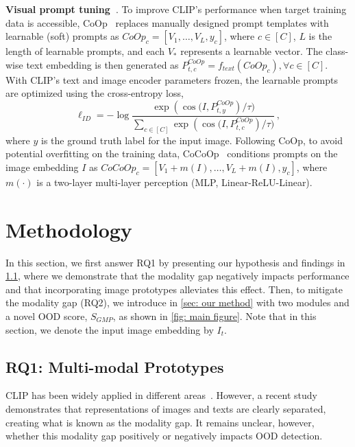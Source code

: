 \noindent
\textbf{Visual prompt tuning~\cite{zhou_learning_2022,zhou2022cocoop,guo_pfedprompt_2023,yao_visual-language_2023}}. 
To improve CLIP's performance when target training data is accessible, CoOp~\cite{zhou_learning_2022} replaces manually designed prompt templates with learnable (soft) prompts as $\textit{CoOp}_c=[V_1, \ldots, V_L, y_c]$, where $c \in [C]$, $L$ is the length of learnable prompts, and each $V_*$ represents a learnable vector. 
The class-wise text embedding is then generated as $P^{\textit{CoOp}}_{t, c}=f_{\textit{text}}(\textit{CoOp}_c), \forall c \in [C]$. 
With CLIP's text and image encoder parameters frozen, the learnable prompts are optimized using the cross-entropy loss,
\begin{equation}
    \ell_{\textit{ID}} = -\log \frac{\exp({\operatorname{cos}(I, P_{t, y}^{\textit{CoOp}} })/ \tau)}{\sum_{c \in [C]} \exp({\operatorname{cos}(I, P_{t, c}^{\textit{CoOp}}})/\tau)}\,,
\end{equation}
where $y$ is the ground truth label for the input image. 
Following CoOp, to avoid potential overfitting on the training data, CoCoOp~\cite{zhou2022cocoop} 
conditions prompts on the image embedding $I$ as $\textit{CoCoOp}_c=[V_1 + m(I),\ldots, V_L+m(I), y_c]$, 
where $m(\cdot)$ is a two-layer multi-layer perception (MLP, Linear-ReLU-Linear).

\section{Methodology}

In this section, we first answer RQ1 by presenting our hypothesis and findings in \cref{Sec: MMA}, where we demonstrate that the modality gap negatively impacts performance and that incorporating image prototypes alleviates this effect.
Then, to mitigate the modality gap (RQ2), we introduce \ours in \cref{sec: our method} with two modules and a novel OOD score, $S_{\textit{GMP}}$, as shown in \cref{fig: main figure}. 
Note that in this section, we denote the input image embedding by $I_t$.

\subsection{RQ1: Multi-modal Prototypes}
\label{Sec: MMA}

CLIP has been widely applied in different areas~\cite{tschannen_clippo_2023,gao_clip2tv_2022}. 
However, a recent study~\cite{liang2022mind} demonstrates that representations of images and texts are clearly separated, creating what is known as the modality gap. 
It remains unclear, however, whether this modality gap positively or negatively impacts OOD detection.

